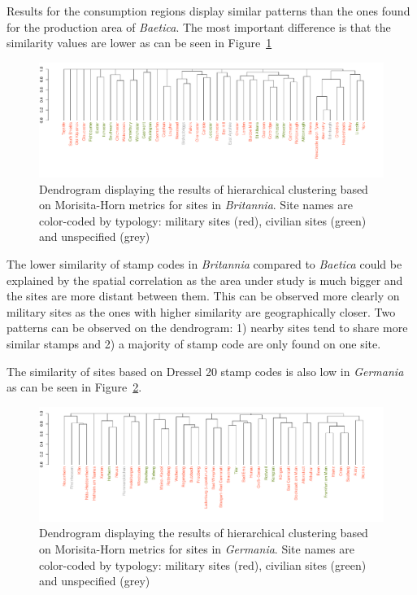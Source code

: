 \documentclass[review]{elsarticle}
\newcommand{\memo}[2]{\textcolor{#1}{#2}}
\newcommand{\xavi}[1]{\memo{magenta}{XRC: #1\\}}
\begin{document}
Results for the consumption regions display similar patterns than the ones found for the production area of \textit{Baetica}. The most important difference is that the similarity values are lower as can be seen in Figure~\ref{britmap}


\begin{figure}
	\centering
\includegraphics[angle=180,width=\linewidth]{figs/dendrobrit5.pdf}
\caption{Dendrogram displaying the results of hierarchical clustering based on Morisita-Horn metrics for sites in \textit{Britannia}. Site names are color-coded by typology: military sites (red), civilian sites (green) and unspecified (grey)}
\label{britmap}
\end{figure}

The lower similarity of stamp codes in \textit{Britannia} compared to \textit{Baetica} could be explained by the spatial correlation as the area under study is much bigger and the sites are more distant between them. This can be observed more clearly on military sites as the ones with higher similarity are geographically closer. Two patterns can be observed on the dendrogram: 1) nearby sites tend to share more similar stamps and 2) a majority of stamp code are only found on one site.

    
 
The similarity of sites based on Dressel 20 stamp codes is also low in \textit{Germania} as can be seen in Figure~\ref{germap}. 

\begin{figure}
	\centering
\includegraphics[angle=180, width=\linewidth]{figs/dendroger5.pdf}
\caption{Dendrogram displaying the results of hierarchical clustering based on Morisita-Horn metrics for sites in \textit{Germania}. Site names are color-coded by typology: military sites (red), civilian sites (green) and unspecified (grey)}
\label{germap}
\end{figure}
\end{document}
